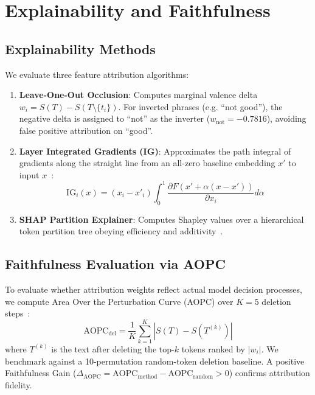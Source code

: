 \documentclass[10pt,twocolumn,letterpaper]{article}
\begin{document}
\section{Explainability and Faithfulness}

\subsection{Explainability Methods}
We evaluate three feature attribution algorithms:
\begin{enumerate}
    \item \textbf{Leave-One-Out Occlusion}: Computes marginal valence delta $w_i = S(T) - S(T \setminus \{t_i\})$. For inverted phrases (e.g. ``not good''), the negative delta is assigned to ``not'' as the inverter ($w_{\text{not}} = -0.7816$), avoiding false positive attribution on ``good''.
    \item \textbf{Layer Integrated Gradients (IG)}: Approximates the path integral of gradients along the straight line from an all-zero baseline embedding $x'$ to input $x$~\cite{sundararajan2017axiomatic}:
    \begin{equation}
        \text{IG}_i(x) = (x_i - x'_i) \int_0^1 \frac{\partial F(x' + \alpha(x - x'))}{\partial x_i} d\alpha
    \end{equation}
    \item \textbf{SHAP Partition Explainer}: Computes Shapley values over a hierarchical token partition tree obeying efficiency and additivity~\cite{lundberg2017unified}.
\end{enumerate}



\subsection{Faithfulness Evaluation via AOPC}
To evaluate whether attribution weights reflect actual model decision processes, we compute Area Over the Perturbation Curve (AOPC) over $K=5$ deletion steps~\cite{samek2017evaluating}:
\begin{equation}
    \text{AOPC}_{\text{del}} = \frac{1}{K} \sum_{k=1}^K |S(T) - S(T^{(k)})|
\end{equation}
where $T^{(k)}$ is the text after deleting the top-$k$ tokens ranked by $|w_i|$. We benchmark against a 10-permutation random-token deletion baseline. A positive Faithfulness Gain ($\Delta_{\text{AOPC}} = \text{AOPC}_{\text{method}} - \text{AOPC}_{\text{random}} > 0$) confirms attribution fidelity.
\end{document}
